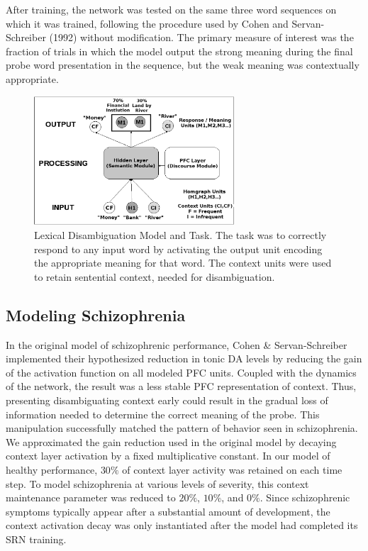 After training, the network was tested on the same three word sequences on which it was trained, following the procedure used by Cohen and Servan-Schreiber (1992) without modification. The primary measure of interest was the fraction of trials in which the model output the strong meaning during the final probe word presentation in the sequence, but the weak meaning was contextually appropriate.

\begin{figure}[tp]
\begin{center}
	\includegraphics[width=75mm]{figures/lexAmb_network_cartoon.eps}
\end{center}
\caption{Lexical Disambiguation Model and Task.  The task was to correctly respond to any input word by activating the output unit encoding the appropriate meaning for that word. The context units were used to retain sentential context, needed for disambiguation.}
\label{lexamb-model-task}
\end{figure} 

\subsection{Modeling Schizophrenia}
In the original model of schizophrenic performance, Cohen \& Servan-Schreiber implemented their hypothesized reduction in tonic DA levels by reducing the gain of the activation function on all modeled PFC units. Coupled with the dynamics of the network, the result was a less stable PFC representation of context. Thus, presenting disambiguating context early could result in the gradual loss of information needed to determine the correct meaning of the probe. This manipulation successfully matched the pattern of behavior seen in schizophrenia. We approximated the gain reduction used in the original model by decaying context layer activation by a fixed multiplicative constant. In our model of healthy performance, $30\%$ of context layer activity was retained on each time step. To model schizophrenia at various levels of severity, this context maintenance parameter was reduced to $20\%$, $10\%$, and $0\%$. Since schizophrenic symptoms typically appear after a substantial amount of development, the context activation decay was only instantiated after the model had completed its SRN training.

